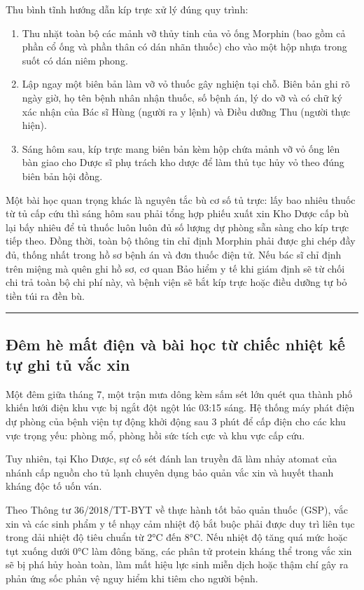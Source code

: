 \documentclass[12pt,a4paper]{article}
\begin{document}
Thu bình tĩnh hướng dẫn kíp trực xử lý đúng quy trình:
\begin{enumerate}[leftmargin=*]
    \item Thu nhặt toàn bộ các mảnh vỡ thủy tinh của vỏ ống Morphin (bao gồm cả phần cổ ống và phần thân có dán nhãn thuốc) cho vào một hộp nhựa trong suốt có dán niêm phong.
    \item Lập ngay một biên bản làm vỡ vỏ thuốc gây nghiện tại chỗ. Biên bản ghi rõ ngày giờ, họ tên bệnh nhân nhận thuốc, số bệnh án, lý do vỡ và có chữ ký xác nhận của Bác sĩ Hùng (người ra y lệnh) và Điều dưỡng Thu (người thực hiện).
    \item Sáng hôm sau, kíp trực mang biên bản kèm hộp chứa mảnh vỡ vỏ ống lên bàn giao cho Dược sĩ phụ trách kho dược để làm thủ tục hủy vỏ theo đúng biên bản hội đồng.
\end{enumerate}

Một bài học quan trọng khác là nguyên tắc bù cơ số tủ trực: lấy bao nhiêu thuốc từ tủ cấp cứu thì sáng hôm sau phải tổng hợp phiếu xuất xin Kho Dược cấp bù lại bấy nhiêu để tủ thuốc luôn luôn đủ số lượng dự phòng sẵn sàng cho kíp trực tiếp theo. Đồng thời, toàn bộ thông tin chỉ định Morphin phải được ghi chép đầy đủ, thống nhất trong hồ sơ bệnh án và đơn thuốc điện tử. Nếu bác sĩ chỉ định trên miệng mà quên ghi hồ sơ, cơ quan Bảo hiểm y tế khi giám định sẽ từ chối chi trả toàn bộ chi phí này, và bệnh viện sẽ bắt kíp trực hoặc điều dưỡng tự bỏ tiền túi ra đền bù.

\vspace{0.8em}
\noindent\rule{\textwidth}{0.4pt}

\subsection{Đêm hè mất điện và bài học từ chiếc nhiệt kế tự ghi tủ vắc xin}

Một đêm giữa tháng 7, một trận mưa dông kèm sấm sét lớn quét qua thành phố khiến lưới điện khu vực bị ngắt đột ngột lúc 03:15 sáng. Hệ thống máy phát điện dự phòng của bệnh viện tự động khởi động sau 3 phút để cấp điện cho các khu vực trọng yếu: phòng mổ, phòng hồi sức tích cực và khu vực cấp cứu.

Tuy nhiên, tại Kho Dược, sự cố sét đánh lan truyền đã làm nhảy atomat của nhánh cấp nguồn cho tủ lạnh chuyên dụng bảo quản vắc xin và huyết thanh kháng độc tố uốn ván. 

Theo Thông tư 36/2018/TT-BYT về thực hành tốt bảo quản thuốc (GSP), vắc xin và các sinh phẩm y tế nhạy cảm nhiệt độ bắt buộc phải được duy trì liên tục trong dải nhiệt độ tiêu chuẩn từ 2°C đến 8°C. Nếu nhiệt độ tăng quá mức hoặc tụt xuống dưới 0°C làm đông băng, các phân tử protein kháng thể trong vắc xin sẽ bị phá hủy hoàn toàn, làm mất hiệu lực sinh miễn dịch hoặc thậm chí gây ra phản ứng sốc phản vệ nguy hiểm khi tiêm cho người bệnh.
\end{document}

